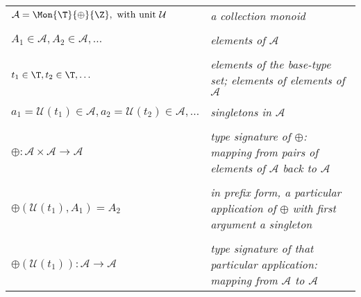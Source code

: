 \begin{center}
\begin{tabular}{ll}
  $\mathcal{A}=\Mon{\T}{\oplus}{\Z},\text{ with unit }\mathcal{U}$
     &{\emph{a collection monoid}}\\&\\
  $A_1\in\mathcal{A}, A_2\in\mathcal{A}, \ldots$
     &{\emph{elements of $\mathcal{A}$}}\\&\\
  $t_1\in\T, t_2\in\T, \ldots$
     &{\parbox{2.85in}{\emph{elements of the base-type set; 
       elements of elements of $\mathcal{A}$}}}\\&\\
  $a_1=\mathcal{U}(t_1)\in\mathcal{A}, 
     a_2=\mathcal{U}(t_2)\in\mathcal{A}, \ldots$
     &{\emph{singletons in $\mathcal{A}$}}\\&\\
  $\oplus:\mathcal{A}\times\mathcal{A}\rightarrow\mathcal{A}$
     &\parbox{2.85in}{\emph{type signature of $\oplus$: mapping from 
     pairs of elements of $\mathcal{A}$ back to $\mathcal{A}$}}\\&\\
  $\oplus\left(\mathcal{U}\left(t_1\right),
     A_{1}\right) = A_2$
     &{\parbox{2.85in}{\emph{in prefix form, a particular application 
     of $\oplus$ with first argument a singleton}}}\\&\\
  $\oplus\left(\mathcal{U}\left(t_1\right)\right):
     \mathcal{A}\rightarrow\mathcal{A}$
     &{\parbox{2.85in}{\emph{type signature of that particular application: 
     mapping from $\mathcal{A}$ to $\mathcal{A}$}}}
\end{tabular}
\end{center}




